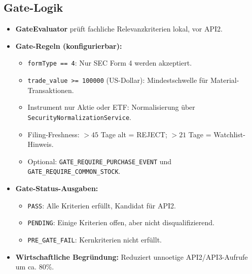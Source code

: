 \subsection{Gate-Logik}
\begin{itemize}
  \item \textbf{GateEvaluator} prüft fachliche Relevanzkriterien lokal, vor API2. %
  \item \textbf{Gate-Regeln (konfigurierbar):} %
    \begin{itemize}
      \item \texttt{formType == 4}: Nur SEC Form 4 werden akzeptiert.
      \item \texttt{trade\_value >= 100000} (US-Dollar): Mindestschwelle für Material-Transaktionen.
      \item Instrument nur Aktie oder ETF: Normalisierung über \texttt{SecurityNormalizationService}.
      \item Filing-Freshness: $>45$ Tage alt = REJECT; $>21$ Tage = Watchlist-Hinweis.
      \item Optional: \texttt{GATE\_REQUIRE\_PURCHASE\_EVENT} und \texttt{GATE\_REQUIRE\_COMMON\_STOCK}.
    \end{itemize}
  \item \textbf{Gate-Status-Ausgaben:} %
    \begin{itemize}
      \item \texttt{PASS}: Alle Kriterien erfüllt, Kandidat für API2.
      \item \texttt{PENDING}: Einige Kriterien offen, aber nicht disqualifizierend.
      \item \texttt{PRE\_GATE\_FAIL}: Kernkriterien nicht erfüllt.
    \end{itemize}
  \item \textbf{Wirtschaftliche Begründung:} Reduziert unnoetige API2/API3-Aufrufe um ca. 80\%. %
\end{itemize}

